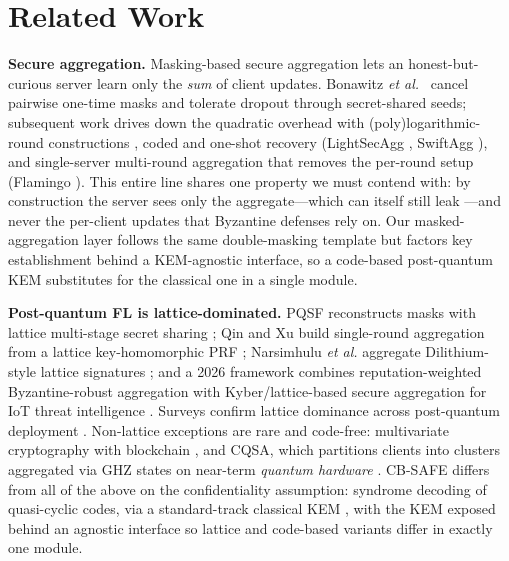 \documentclass[lettersize,journal]{IEEEtran}
\begin{document}
\section{Related Work}
\textbf{Secure aggregation.} Masking-based secure aggregation lets an
honest-but-curious server learn only the \emph{sum} of client updates. Bonawitz
\emph{et al.}\ \cite{bonawitz2017} cancel pairwise one-time masks and tolerate dropout
through secret-shared seeds; subsequent work drives down the quadratic overhead with
(poly)logarithmic-round constructions \cite{bell2020}, coded and one-shot recovery
(LightSecAgg \cite{lightsecagg}, SwiftAgg \cite{swiftagg}), and single-server
multi-round aggregation that removes the per-round setup (Flamingo \cite{flamingo}).
This entire line shares one property we must contend with: by construction the server
sees only the aggregate---which can itself still leak \cite{elkordy2022}---and never
the per-client updates that Byzantine defenses rely on. Our masked-aggregation layer
follows the same double-masking template but factors key establishment behind a
KEM-agnostic interface, so a code-based post-quantum KEM substitutes for the classical
one in a single module.

\textbf{Post-quantum FL is lattice-dominated.} PQSF reconstructs masks with lattice
multi-stage secret sharing \cite{pqsf2024}; Qin and Xu build single-round aggregation
from a lattice key-homomorphic PRF \cite{qinxu2025}; Narsimhulu \emph{et al.}
aggregate Dilithium-style lattice signatures \cite{narsimhulu2026}; and a 2026
framework combines reputation-weighted Byzantine-robust aggregation with
Kyber/lattice-based secure aggregation for IoT threat intelligence
\cite{byzpqfl2026}. Surveys confirm lattice dominance across post-quantum deployment
\cite{nguyen2025lattice}. Non-lattice exceptions are rare and code-free: multivariate
cryptography with blockchain \cite{singh2025pqfog}, and CQSA, which partitions
clients into clusters aggregated via GHZ states on near-term \emph{quantum hardware}
\cite{cqsa2026}. CB-SAFE differs from all of the above on the confidentiality
assumption: syndrome decoding of quasi-cyclic codes, via a standard-track classical
KEM \cite{nistir8545}, with the KEM exposed behind an agnostic interface so lattice
and code-based variants differ in exactly one module.
\end{document}

